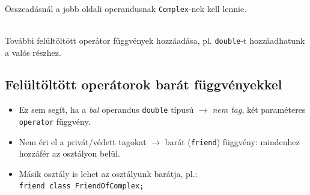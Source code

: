 \documentclass[usenames,dvipsnames,aspectratio=169]{beamer}
\begin{document}
\begin{frame}
    \begin{description}[mm]
        \item[Probléma:] \hfill \\ Összeadásnál a jobb oldali operandusnak \texttt{Complex}-nek kell lennie.
        \item[Megoldás:] \hfill \\ További felültöltött operátor függvények hozzáadása, pl. \texttt{double}-t hozzáadhatunk a valós részhez.
    \end{description}
    \begin{exampleblock}{}
        
    \end{exampleblock}
\end{frame}

\begin{frame}
    \begin{exampleblock}{}
        \footnotesize
        
    \end{exampleblock}
\end{frame}

\subsection{Felültöltött operátorok barát függvényekkel}

\begin{frame}
    \begin{itemize}
        \item Ez sem segít, ha a \emph{bal} operandus \texttt{double} típusú $\to$ \emph{nem tag}, két paraméteres \texttt{operator} függvény.
        \item Nem éri el a privát/védett tagokat $\to$ barát (\texttt{friend}) függvény: mindenhez hozzáfér az osztályon belül.
        \item Másik osztály is lehet az osztályunk barátja, pl.: \\ \texttt{friend class FriendOfComplex;}
    \end{itemize}
\end{frame}

\begin{frame}
    \begin{exampleblock}{}
        \scriptsize
        
        
    \end{exampleblock}
\end{frame}
\end{document}
